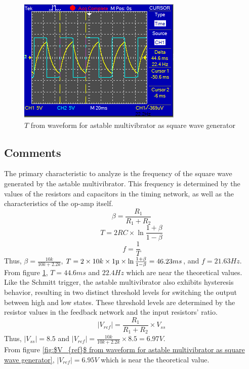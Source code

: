 \documentclass[a4paper, 12pt, english]{article}
\newlength{\simheight}
\begin{document}
\begin{figure}[H]
    \centering
    \includegraphics[width=\linewidth, height=\simheight]{images/Square-Wave-Generator-T-Cursor.png}
    \caption{$T$ from waveform for astable multivibrator as square wave generator}
    \label{fig:T from waveform for astable multivibrator as square wave generator}
\end{figure}

\subsection{Comments}
The primary characteristic to analyze is the frequency of the square wave generated by the astable multivibrator. This frequency is determined by the values of the resistors and capacitors in the timing network, as well as the characteristics of the op-amp itself.
\[ \beta = \frac{R_{1}}{R_{1}+R_{2}}\]
\[ T = 2RC \times \ln{\frac{1+\beta}{1-\beta}}\]
\[ f = \frac{1}{T}\]
Thus, \( \beta = \frac{10k}{10k + 2.2k}\), \( T = 2\times 10k \times 1\micro \times \ln{\frac{1+\beta}{1-\beta}} = 46.23 ms\), and \( f = 21.63Hz\). \\
From figure \ref{fig:T from waveform for astable multivibrator as square wave generator}, $T=44.6ms$ and $22.4Hz$ which are near the theoretical values. \\

Like the Schmitt trigger, the astable multivibrator also exhibits hysteresis behavior, resulting in two distinct threshold levels for switching the output between high and low states. These threshold levels are determined by the resistor values in the feedback network and the input resistors' ratio.
\[ |V_{ref}| = \frac{R_{1}}{R_{1} + R_{2}}  \times V_{ss}\]
Thus, $|V_{ss}|=8.5$ and \(|V_{ref}|=\frac{10k}{10k+2.2k}\times8.5=6.97V\). \\
From figure \ref{fig:$V_{ref}$ from waveform for astable multivibrator as square wave generator}, $|V_{ref}|=6.95V$ which is near the theoretical value.

\newpage

\patchcmd{\thebibliography}{\section*}{\section}{}{}
\end{document}
